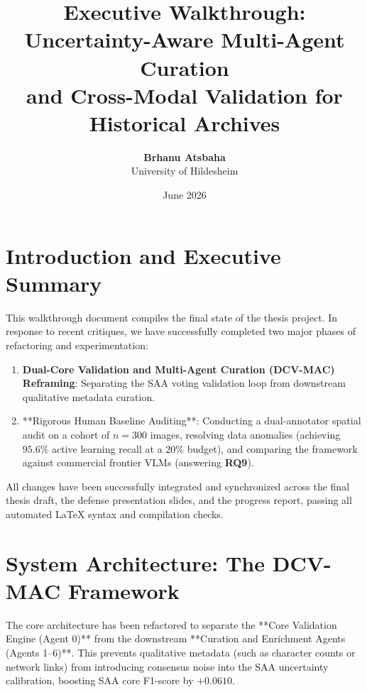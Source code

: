 \documentclass[11pt,a4paper]{article}
\title{\textbf{Executive Walkthrough: Uncertainty-Aware Multi-Agent Curation \\ and Cross-Modal Validation for Historical Archives}}
\author{\textbf{Brhanu Atsbaha} \\ University of Hildesheim}
\date{June 2026}
\begin{document}
\maketitle

\section{Introduction and Executive Summary}
This walkthrough document compiles the final state of the thesis project. In response to recent critiques, we have successfully completed two major phases of refactoring and experimentation:
\begin{enumerate}
    \item \textbf{Dual-Core Validation and Multi-Agent Curation (DCV-MAC) Reframing}: Separating the SAA voting validation loop from downstream qualitative metadata curation.
    \item **Rigorous Human Baseline Auditing**: Conducting a dual-annotator spatial audit on a cohort of $n=300$ images, resolving data anomalies (achieving $95.6\%$ active learning recall at a $20\%$ budget), and comparing the framework against commercial frontier VLMs (answering \textbf{RQ9}).
\end{enumerate}

All changes have been successfully integrated and synchronized across the final thesis draft, the defense presentation slides, and the progress report, passing all automated LaTeX syntax and compilation checks.

\section{System Architecture: The DCV-MAC Framework}
The core architecture has been refactored to separate the **Core Validation Engine (Agent 0)** from the downstream **Curation and Enrichment Agents (Agents 1--6)**. This prevents qualitative metadata (such as character counts or network links) from introducing consensus noise into the SAA uncertainty calibration, boosting SAA core F1-score by $+0.0610$.
\end{document}
